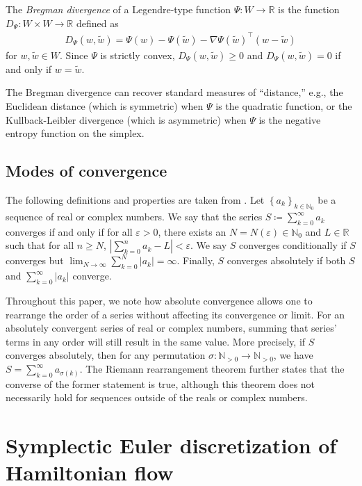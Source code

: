 \documentclass[11pt]{article}
\newcommand{\R}{\mathbb{R}}
\newcommand{\N}{\mathbb{N}}
\begin{document}
The \textit{Bregman divergence} of a Legendre-type function $\Psi:W\rightarrow\R$ is the function $D_{\Psi}:W\times W\rightarrow\R$ defined as  
\begin{gather}
    D_{\Psi}(w,\widetilde{w})=\Psi(w)-\Psi(\widetilde{w})-\nabla\Psi(\widetilde{w})^{\top}(w-\widetilde{w})\nonumber
\end{gather}
for $w,\widetilde{w}\in W$. Since $\Psi$ is strictly convex, $D_{\Psi}(w,\widetilde{w})\geq 0$ and $D_{\Psi}(w,\widetilde{w})=0$ if and only if $w=\widetilde{w}$. 

The Bregman divergence can recover standard measures of ``distance,'' e.g., the Euclidean distance (which is symmetric) when $\Psi$ is the quadratic function, or the Kullback-Leibler divergence (which is asymmetric) when $\Psi$ is the negative entropy function on the simplex.

\subsection{Modes of convergence}\label{odes}

The following definitions and properties are taken from \cite{Ross2013}. Let $\left\{a_{k}\right\}_{k\in\N_{0}}$ be a sequence of real or complex numbers. We say that the series $S\coloneqq \sum_{k=0}^{\infty}{a_{k}}$ converges if and only if for all $\varepsilon>0$, there exists an $N=N\left(\varepsilon\right)\in\N_{0}$ and $L\in\R$ such that for all $n\geq N$, $\left|\sum_{k=0}^{n}{a_{k}}-L\right|<\varepsilon$. We say $S$ converges conditionally if $S$ converges but $\lim_{N\rightarrow\infty}\sum_{k=0}^{N}{\left|a_{k}\right|}=\infty$. Finally, $S$ converges absolutely if both $S$ and $\sum_{k=0}^{\infty}{\left|a_{k}\right|}$ converge.

Throughout this paper, we note how absolute convergence allows one to rearrange the order of a series without affecting its convergence or limit. For an absolutely convergent series of real or complex numbers, summing that series' terms in any order will still result in the same value. More precisely, if $S$ converges absolutely, then for any permutation $\sigma:\N_{>0}\rightarrow\N_{>0}$, we have $S=\sum_{k=0}^{\infty}{a_{\sigma\left(k\right)}}$. The Riemann rearrangement theorem further states that the converse of the former statement is true, although this theorem does not necessarily hold for sequences outside of the reals or complex numbers. 

\section{Symplectic Euler discretization of Hamiltonian flow}
\label{Sec:HamFlowDisc}
\end{document}
